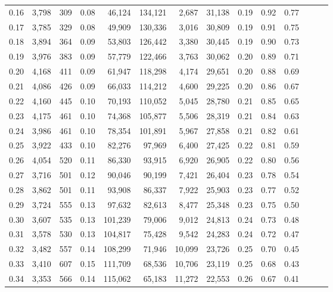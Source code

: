 \begin{tabular}{rrrrrrrrrrrrrr}
0.16 &  3,798 &  309 &  0.08 &   46,124 &  134,121 &   2,687 &  31,138 &  0.19 &  0.92 &      0.77 \\
0.17 &  3,785 &  329 &  0.08 &   49,909 &  130,336 &   3,016 &  30,809 &  0.19 &  0.91 &      0.75 \\
0.18 &  3,894 &  364 &  0.09 &   53,803 &  126,442 &   3,380 &  30,445 &  0.19 &  0.90 &      0.73 \\
0.19 &  3,976 &  383 &  0.09 &   57,779 &  122,466 &   3,763 &  30,062 &  0.20 &  0.89 &      0.71 \\
0.20 &  4,168 &  411 &  0.09 &   61,947 &  118,298 &   4,174 &  29,651 &  0.20 &  0.88 &      0.69 \\
0.21 &  4,086 &  426 &  0.09 &   66,033 &  114,212 &   4,600 &  29,225 &  0.20 &  0.86 &      0.67 \\
0.22 &  4,160 &  445 &  0.10 &   70,193 &  110,052 &   5,045 &  28,780 &  0.21 &  0.85 &      0.65 \\
0.23 &  4,175 &  461 &  0.10 &   74,368 &  105,877 &   5,506 &  28,319 &  0.21 &  0.84 &      0.63 \\
0.24 &  3,986 &  461 &  0.10 &   78,354 &  101,891 &   5,967 &  27,858 &  0.21 &  0.82 &      0.61 \\
0.25 &  3,922 &  433 &  0.10 &   82,276 &   97,969 &   6,400 &  27,425 &  0.22 &  0.81 &      0.59 \\
0.26 &  4,054 &  520 &  0.11 &   86,330 &   93,915 &   6,920 &  26,905 &  0.22 &  0.80 &      0.56 \\
0.27 &  3,716 &  501 &  0.12 &   90,046 &   90,199 &   7,421 &  26,404 &  0.23 &  0.78 &      0.54 \\
0.28 &  3,862 &  501 &  0.11 &   93,908 &   86,337 &   7,922 &  25,903 &  0.23 &  0.77 &      0.52 \\
0.29 &  3,724 &  555 &  0.13 &   97,632 &   82,613 &   8,477 &  25,348 &  0.23 &  0.75 &      0.50 \\
0.30 &  3,607 &  535 &  0.13 &  101,239 &   79,006 &   9,012 &  24,813 &  0.24 &  0.73 &      0.48 \\
0.31 &  3,578 &  530 &  0.13 &  104,817 &   75,428 &   9,542 &  24,283 &  0.24 &  0.72 &      0.47 \\
0.32 &  3,482 &  557 &  0.14 &  108,299 &   71,946 &  10,099 &  23,726 &  0.25 &  0.70 &      0.45 \\
0.33 &  3,410 &  607 &  0.15 &  111,709 &   68,536 &  10,706 &  23,119 &  0.25 &  0.68 &      0.43 \\
0.34 &  3,353 &  566 &  0.14 &  115,062 &   65,183 &  11,272 &  22,553 &  0.26 &  0.67 &      0.41 \\

\end{tabular}
